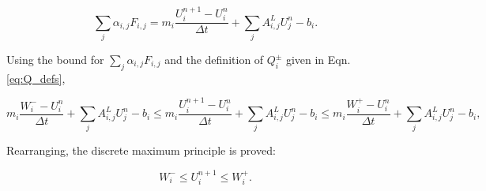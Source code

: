 \[
   \sum\limits_j\alpha_{i,j}F_{i,j} =
   m_i\frac{U_i^{n+1}-U_i^n}{\Delta t}
   + \sum\limits_j A_{i,j}^L U_j^n
   - b_i.
\]

\noindent
Using the bound for $\sum\limits_j\alpha_{i,j}F_{i,j}$ and the definition
of $Q_i^\pm$ given in Eqn. \ref{eq:Q_defs},

\[
m_i\frac{W_i^- -U_i^n}{\Delta t}
   + \sum\limits_j A_{i,j}^L U_j^n
   - b_i
\le m_i\frac{U_i^{n+1}-U_i^n}{\Delta t}
   + \sum\limits_j A_{i,j}^L U_j^n
   - b_i
\le m_i\frac{W_i^+ -U_i^n}{\Delta t}
   + \sum\limits_j A_{i,j}^L U_j^n
   - b_i,
\]

\noindent
Rearranging, the discrete maximum principle is proved:

\[
   W_i^-\le U_i^{n+1}\le W_i^+.
\]
